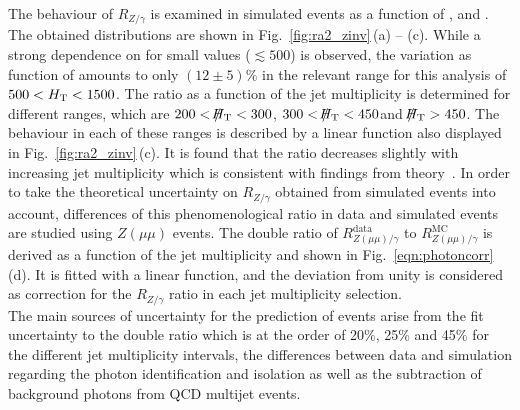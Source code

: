 The behaviour of $R_{Z/\gamma}$ is examined in simulated events as a function of \MHT, \HT and \NJets. The obtained distributions are shown in Fig.~\ref{fig:ra2_zinv}\,(a) -- (c). While a strong dependence on \MHT for small values ($\lesssim 500$\gev) is observed, the variation as function of \HT amounts to only $(12 \pm 5)\%$ in the relevant range for this analysis of $500 < H_{\text{T}} < 1500$\gev. The ratio as a function of the jet multiplicity is determined for different \MHT ranges, which are $200 < \slash\mkern-12mu{H}_{\text{T}} < 300$\gev, $300 < \slash\mkern-12mu{H}_{\text{T}} < 450$\gev and $\slash\mkern-12mu{H}_{\text{T}} > 450$\gev. The behaviour in each of these \MHT ranges is described by a linear function also displayed in Fig.~\ref{fig:ra2_zinv}\,(c). It is found that the ratio decreases slightly with increasing jet multiplicity which is consistent with findings from theory~\cite{Bern:2012vx, Bern:2011pa}. In order to take the theoretical uncertainty on $R_{Z/\gamma}$ obtained from simulated events into account, differences of this phenomenological ratio in data and simulated events are studied using $Z(\mu\mu)$ events. The double ratio of $R_{Z(\mu\mu)/\gamma}^{\text{data}}$ to $R_{Z(\mu\mu)/\gamma}^{\text{MC}}$ is derived as a function of the jet multiplicity and shown in Fig.~\ref{eqn:photoncorr}\,(d). It is fitted with a linear function, and the deviation from unity is considered as correction for the $R_{Z/\gamma}$ ratio in each jet multiplicity selection. \\
The main sources of uncertainty for the prediction of \ZInvJets events arise from the fit uncertainty to the double ratio which is at the order of 20\%, 25\% and 45\% for the different jet multiplicity intervals, the differences between data and simulation regarding the photon identification and isolation as well as the subtraction of background photons from QCD multijet events.

